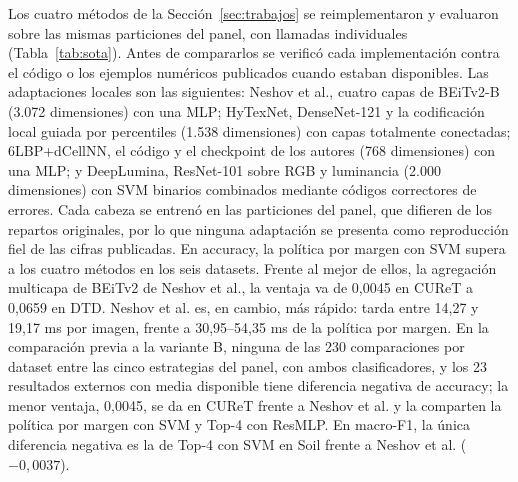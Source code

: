 \documentclass[a4paper,fleqn]{cas-sc}
\begin{document}
Los cuatro métodos de la Sección~\ref{sec:trabajos} se reimplementaron y evaluaron sobre las mismas particiones del panel, con llamadas individuales (Tabla~\ref{tab:sota}). Antes de compararlos se verificó cada implementación contra el código o los ejemplos numéricos publicados cuando estaban disponibles. Las adaptaciones locales son las siguientes: Neshov et al., cuatro capas de BEiTv2-B (3.072 dimensiones) con una MLP; HyTexNet, DenseNet-121 y la codificación local guiada por percentiles (1.538 dimensiones) con capas totalmente conectadas; 6LBP+dCellNN, el código y el checkpoint de los autores (768 dimensiones) con una MLP; y DeepLumina, ResNet-101 sobre RGB y luminancia (2.000 dimensiones) con SVM binarios combinados mediante códigos correctores de errores. Cada cabeza se entrenó en las particiones del panel, que difieren de los repartos originales, por lo que ninguna adaptación se presenta como reproducción fiel de las cifras publicadas. En accuracy, la política por margen con SVM supera a los cuatro métodos en los seis datasets. Frente al mejor de ellos, la agregación multicapa de BEiTv2 de Neshov et al., la ventaja va de 0,0045 en CUReT a 0,0659 en DTD. Neshov et al. es, en cambio, más rápido: tarda entre 14,27 y 19,17 ms por imagen, frente a 30,95--54,35 ms de la política por margen. En la comparación previa a la variante B, ninguna de las 230 comparaciones por dataset entre las cinco estrategias del panel, con ambos clasificadores, y los 23 resultados externos con media disponible tiene diferencia negativa de accuracy; la menor ventaja, 0,0045, se da en CUReT frente a Neshov et al. y la comparten la política por margen con SVM y Top-4 con ResMLP. En macro-F1, la única diferencia negativa es la de Top-4 con SVM en Soil frente a Neshov et al. ($-0{,}0037$).
\end{document}
